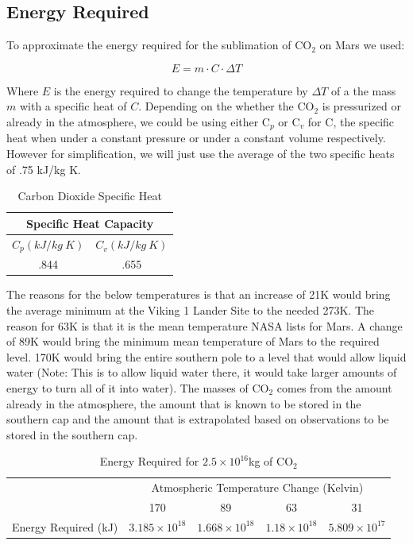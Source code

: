 \documentclass[a4paper]{article}
\begin{document}
    \subsection{Energy Required}
    
    To approximate the energy required for the sublimation of CO$_2$ on Mars we used:
    
    \[ E = m \cdot C \cdot \Delta T\]
    
    Where $E$ is the energy required to change the temperature by $\Delta T$ of a the mass $m$ with a specific heat of $C$. Depending on the whether the CO$_2$ is pressurized or already in the atmosphere,  we could be using either C$_p$ or C$_v$ for C, the specific heat when under a constant pressure or under a constant volume respectively. However for simplification, we will just use the average of the two specific heats of .75 kJ/kg K.
    
    \begin{table}[H]
		\centering
		\caption{Carbon Dioxide Specific Heat \cite{flsmidth_gases_????}}
		\begin{tabular}{|c|c|}
		\hline
		\multicolumn{2}{|c|}{Specific Heat Capacity} \\ \hline
		$C_p  (kJ/kg\ K)$                    & $C_v (kJ/kg\ K)$                   \\ \hline
		.844                  & .655                 \\ \hline
		\end{tabular}
	\end{table}
    
    The reasons for the below temperatures is that an increase of 21K would bring the average minimum at the Viking 1 Lander Site to the needed 273K. The reason for 63K is that it is the mean temperature NASA lists for Mars. A change of 89K would bring the minimum mean temperature of Mars to the required level. 170K would bring the entire southern pole to a level that would allow liquid water (Note: This is to allow liquid water there, it would take larger amounts of energy to turn all of it into water). The masses of CO$_2$ comes from the amount already in the atmosphere, the amount that is known to be stored in the southern cap and the amount that is extrapolated based on observations to be stored in the southern cap.

\begin{table}[H]
\centering
\caption{Energy Required for $2.5 \times 10^{16}$kg of CO$_2$}
\begin{tabular}{|c|c|c|c|c|}
\hline
    			  & \multicolumn{4}{c|}{Atmospheric Temperature Change (Kelvin)} \\ \cline{2-5} 
   				  & 170            & 89            & 63           & 31           \\ \hline
Energy Required (kJ)&   $3.185 \times 10^{18}$             &      $1.668 \times 10^{18}$          &   $1.18 \times 10^{18}$            &   $5.809  \times 10^{17}$          \\ \hline
\end{tabular}
\end{table}
\end{document}
